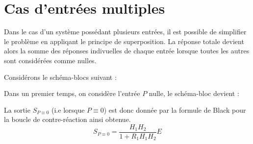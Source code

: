\newpage
\section{Cas d'entrées multiples}

Dans le cas d'un système possédant plusieurs entrées, il est possible de simplifier 
le problème en appliqant le principe de superposition. La réponse totale devient alors la somme
des réponses indivuelles de chaque entrée lorsque toutes les autres sont considérées comme nulles.

Considérons le schéma-blocs suivant :
\begin{center}                                                                                                                
\end{center}                                                                                                                  

Dans un premier temps, on considère l'entrée $P$ nulle, le schéma-bloc devient :
\begin{center}                                                                                                                
\end{center}                                                                                                                  
La sortie $S_{P\equiv 0}$ (i.e lorsque $P\equiv0$) est donc donnée 
par la formule de Black pour la boucle de contre-réaction ainsi obtenue.
$$
S_{P\equiv 0}=\dfrac{H_1H_2}{1+R_1H_1H_2} E
$$

